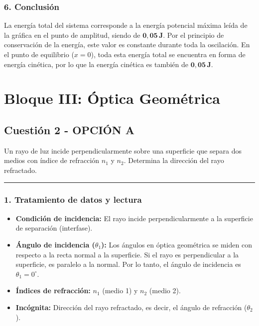 \subsubsection*{6. Conclusión}
\begin{cajaconclusion}
    La energía total del sistema corresponde a la energía potencial máxima leída de la gráfica en el punto de amplitud, siendo de $\mathbf{0,05 \, J}$. Por el principio de conservación de la energía, este valor es constante durante toda la oscilación. En el punto de equilibrio ($x=0$), toda esta energía total se encuentra en forma de energía cinética, por lo que la energía cinética es también de $\mathbf{0,05 \, J}$.
\end{cajaconclusion}

\newpage

\section{Bloque III: Óptica Geométrica}
\label{sec:optica_2005_sep_cv}

\subsection{Cuestión 2 - OPCIÓN A}
\label{subsec:3A_2005_sep_cv}

\begin{cajaenunciado}
Un rayo de luz incide perpendicularmente sobre una superficie que separa dos medios con índice de refracción $n_1$ y $n_2$. Determina la dirección del rayo refractado.
\end{cajaenunciado}
\hrule

\subsubsection*{1. Tratamiento de datos y lectura}
\begin{itemize}
    \item \textbf{Condición de incidencia:} El rayo incide perpendicularmente a la superficie de separación (interfase).
    \item \textbf{Ángulo de incidencia ($\theta_1$):} Los ángulos en óptica geométrica se miden con respecto a la recta normal a la superficie. Si el rayo es perpendicular a la superficie, es paralelo a la normal. Por lo tanto, el ángulo de incidencia es $\theta_1 = 0^\circ$.
    \item \textbf{Índices de refracción:} $n_1$ (medio 1) y $n_2$ (medio 2).
    \item \textbf{Incógnita:} Dirección del rayo refractado, es decir, el ángulo de refracción ($\theta_2$).
\end{itemize}

